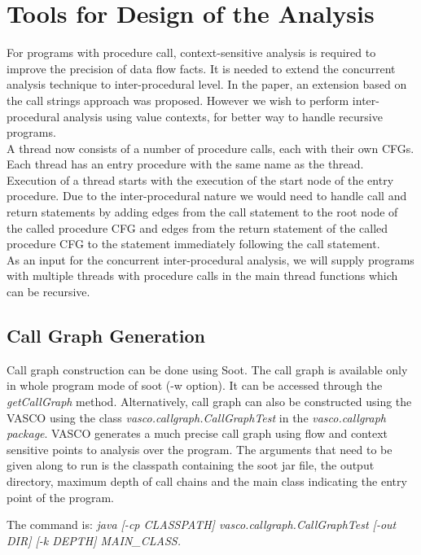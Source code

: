 \chapter{Tools for Design of the Analysis}

For programs with procedure call, context-sensitive analysis is required to improve the precision of data flow facts. It is needed to extend the concurrent analysis technique to inter-procedural level. In the paper, an extension based on the call strings approach was proposed. However we wish to perform inter-procedural analysis using value contexts, for better way to handle recursive programs. \\

A thread now consists of a number of procedure calls, each with their own CFGs. Each thread has an entry procedure with the same name as the thread. Execution of a thread starts with the execution of the start node of the entry procedure. Due to the inter-procedural nature we would need to handle call and return statements by adding edges from the call statement to the root node of the called procedure CFG and edges from the return statement of the called procedure CFG to the statement immediately following the call statement. \\

As an input for the concurrent inter-procedural analysis, we will supply programs with multiple threads with procedure calls in the main thread functions which can be recursive. 

\section{Call Graph Generation}

Call graph construction can be done using Soot\cite{sootguide}. The call graph is available only in whole program mode of soot (-w option). It can be accessed through the \emph{getCallGraph} method. Alternatively, call graph can also be constructed using the VASCO using the class \emph{vasco.callgraph.CallGraphTest} in the \emph{vasco.callgraph package}. VASCO generates a much precise call graph using flow and context sensitive points to analysis over the program. The arguments that need to be given along to run is the classpath containing the soot jar file, the output directory, maximum depth of call chains and the main class indicating the entry point of the program. 

The command is: \newline
\emph{java [-cp CLASSPATH] vasco.callgraph.CallGraphTest [-out DIR] [-k DEPTH] MAIN\_CLASS.} \newline

